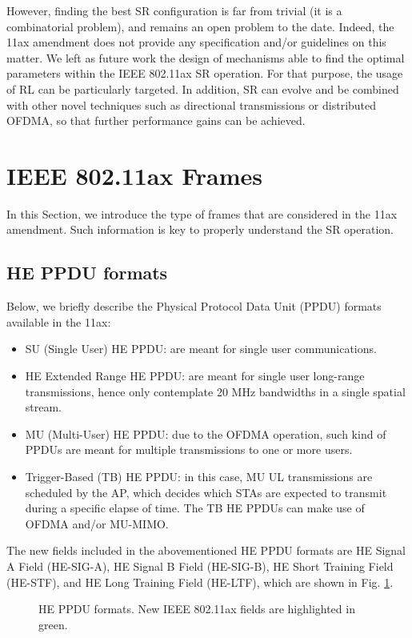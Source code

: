 \documentclass{ieeeaccess}
\begin{document}
However, finding the best SR configuration is far from trivial (it is a combinatorial problem), and remains an open problem to the date. Indeed, the 11ax amendment does not provide any specification and/or guidelines on this matter. We left as future work the design of mechanisms able to find the optimal parameters within the IEEE 802.11ax SR operation. For that purpose, the usage of RL can be particularly targeted. In addition, SR can evolve and be combined with other novel techniques such as directional transmissions or distributed OFDMA, so that further performance gains can be achieved.

%
\appendices
\section{IEEE 802.11ax Frames}
\label{section:frames}
In this Section, we introduce the type of frames that are considered in the 11ax amendment. Such information is key to properly understand the SR operation.

\subsection{HE PPDU formats}
Below, we briefly describe the Physical Protocol Data Unit (PPDU) formats available in the 11ax:
\begin{itemize}
	\item SU (Single User) HE PPDU: are meant for single user communications.
	\item  HE Extended Range HE PPDU: are meant for single user long-range transmissions, hence only contemplate 20 MHz bandwidths in a single spatial stream.
	\item  MU (Multi-User) HE PPDU: due to the OFDMA operation, such kind of PPDUs are meant for multiple transmissions to one or more users.
	\item Trigger-Based (TB) HE PPDU: in this case, MU UL transmissions are scheduled by the AP, which decides which STAs are expected to transmit during a specific elapse of time. The TB HE PPDUs can make use of OFDMA and/or MU-MIMO.
\end{itemize}

The new fields included in the abovementioned HE PPDU formats are HE Signal A Field (HE-SIG-A), HE Signal B Field (HE-SIG-B), HE Short Training Field (HE-STF), and HE Long Training Field (HE-LTF), which are shown in Fig. \ref{fig:appendix_1}.
\begin{figure}[ht!]
	\centering
	\caption{HE PPDU formats. New IEEE 802.11ax fields are highlighted in green.}
	\label{fig:appendix_1}
\end{figure}
\end{document}
